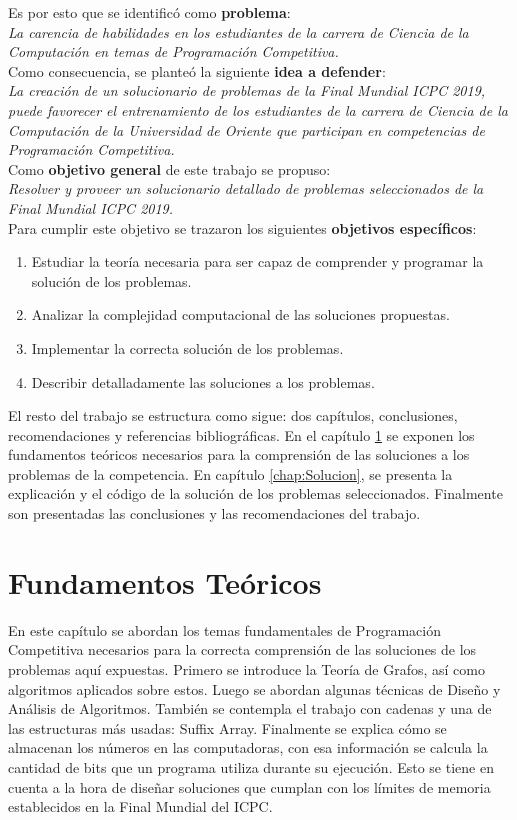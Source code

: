 \documentclass{report}
\begin{document}
Es por esto que se identific\'o como {\bf problema}:\\
{\it La carencia de habilidades en los estudiantes de la carrera de Ciencia de la Computaci\'on en
temas de Programaci\'on Competitiva.}\\[0.2cm]
Como consecuencia, se plante\'o la siguiente {\bf idea a defender}:\\
{\it La creaci\'on de un solucionario de problemas de la Final Mundial ICPC 2019, puede
favorecer el entrenamiento de los estudiantes de la carrera de Ciencia de la Computaci\'on de la
Universidad de Oriente que participan en competencias de Programaci\'on Competitiva.}\\[0.2cm]
Como {\bf objetivo general} de este trabajo se propuso:\\
{\it Resolver y proveer un solucionario detallado de problemas seleccionados de
la Final Mundial ICPC 2019.}\\
Para cumplir este objetivo se trazaron los siguientes {\bf objetivos espec\'ificos}:\\
\begin{enumerate}
	\item  Estudiar la teor\'ia necesaria para ser capaz de comprender y programar la soluci\'on de los
	problemas. 				
	\item Analizar la complejidad computacional de las soluciones propuestas.
	\item  Implementar la correcta soluci\'on de los problemas.
	\item Describir detalladamente las soluciones a los problemas. 
\end{enumerate} 

El resto del trabajo se estructura como sigue: dos cap\'itulos, conclusiones, recomendaciones y referencias bibliogr\'aficas. En el cap\'itulo \ref{chap:FundamentoTeorico} se exponen los fundamentos te\'oricos necesarios para la comprensi\'on de las soluciones a los problemas de la competencia. En cap\'itulo \ref{chap:Solucion}, se presenta la explicaci\'on y el c\'odigo de la soluci\'on de los problemas seleccionados. Finalmente son presentadas las conclusiones y las recomendaciones del trabajo. 

\chapter{Fundamentos Te\'oricos}
\label{chap:FundamentoTeorico}
En este cap\'itulo se abordan los temas fundamentales de Programaci\'on Competitiva necesarios para la correcta comprensi\'on de las soluciones de los problemas aqu\'i expuestas. Primero se introduce la Teor\'ia de Grafos, as\'i como algoritmos aplicados sobre estos. Luego se abordan algunas t\'ecnicas de Dise\~no y An\'alisis de Algoritmos. Tambi\'en se contempla el trabajo con cadenas y una de las estructuras m\'as usadas: Suffix Array. Finalmente se explica c\'omo se almacenan los n\'umeros en las computadoras, con esa informaci\'on se calcula la cantidad de bits que un programa utiliza durante su ejecuci\'on. Esto se tiene en cuenta a la hora de dise\~nar soluciones que cumplan con los l\'imites de memoria establecidos en la Final Mundial del ICPC.
\end{document}
